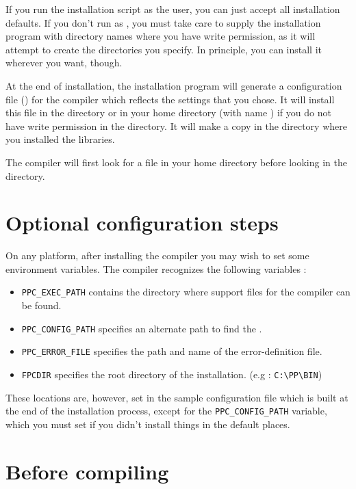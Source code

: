 If you run the installation script as the  user, you can just accept all installation
defaults. If you don't run as , you must take care to supply the
installation program with directory names where you have write permission,
as it will attempt to create the directories you specify.
In principle, you can install it wherever you want, though.

At the end of installation, the installation program will generate a
configuration file () for the \fpc compiler which 
reflects the settings that you chose. It will install this file in 
the  directory or in your home directory (with name
) if you do not have write permission in the 
directory. It will make a copy in the directory where you installed the 
libraries.

The compiler will first look for a file  in your home 
directory before looking in the  directory.

\section{Optional configuration steps}
On any platform, after installing the compiler you may wish to set
some environment variables. The \fpc compiler recognizes the 
following variables :

\begin{itemize}
\item \verb|PPC_EXEC_PATH| contains the directory where support files for
the compiler can be found.
\item \verb|PPC_CONFIG_PATH| specifies an alternate path to find the .
\item \verb|PPC_ERROR_FILE|  specifies the path and name of the error-definition file.
\item \verb|FPCDIR| specifies the root directory of the \fpc installation.
(e.g : \verb|C:\PP\BIN|)
\end{itemize}

These locations are, however, set in the sample configuration file which is
built at the end of the installation process, except for the
\verb|PPC_CONFIG_PATH| variable, which you must set if you didn't install
things in the default places.

\section{Before compiling}

